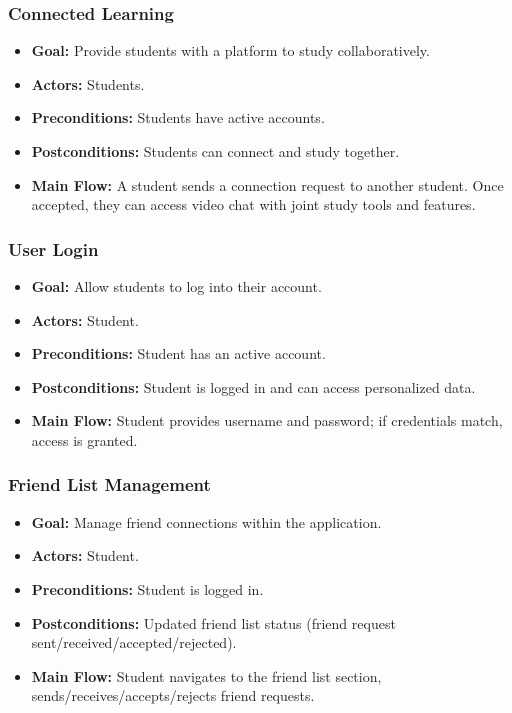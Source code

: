 \documentclass[12pt]{article}
\begin{document}
\subsubsection{Connected Learning}
\begin{itemize}
    \item \textbf{Goal:} Provide students with a platform to study collaboratively.
    \item \textbf{Actors:} Students.
    \item \textbf{Preconditions:} Students have active accounts.
    \item \textbf{Postconditions:} Students can connect and study together.
    \item \textbf{Main Flow:} A student sends a connection request to another student. Once accepted, they can access video chat with joint study tools and features.
\end{itemize}

\subsubsection{User Login}
\begin{itemize}
    \item \textbf{Goal:} Allow students to log into their account.
    \item \textbf{Actors:} Student.
    \item \textbf{Preconditions:} Student has an active account.
    \item \textbf{Postconditions:} Student is logged in and can access personalized data.
    \item \textbf{Main Flow:} Student provides username and password; if credentials match, access is granted.
\end{itemize}

\subsubsection{Friend List Management}
\begin{itemize}
    \item \textbf{Goal:} Manage friend connections within the application.
    \item \textbf{Actors:} Student.
    \item \textbf{Preconditions:} Student is logged in.
    \item \textbf{Postconditions:} Updated friend list status (friend request sent/received/accepted/rejected).
    \item \textbf{Main Flow:} Student navigates to the friend list section, sends/receives/accepts/rejects friend requests.
\end{itemize}
\end{document}
